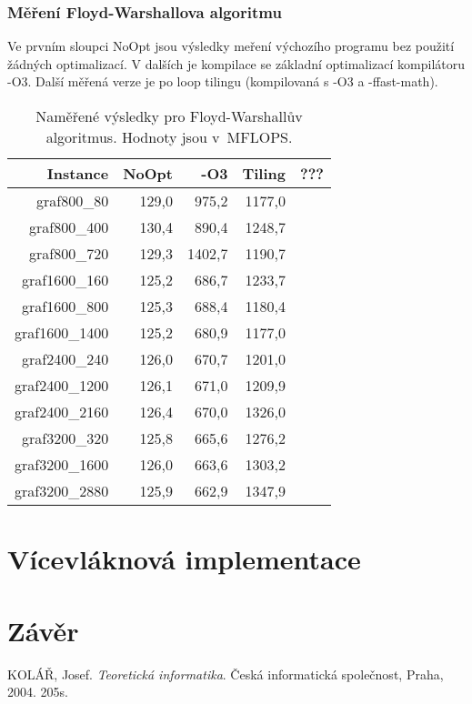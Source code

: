 \documentclass[a4paper,11pt]{article}
\begin{document}
\subsubsection{Měření Floyd-Warshallova algoritmu}
Ve prvním sloupci NoOpt jsou výsledky meření výchozího programu bez použití žádných optimalizací. V dalších je kompilace se základní optimalizací kompilátoru -O3. Další měřená verze je po loop tilingu (kompilovaná s -O3 a -ffast-math).
\begin{table}[H]
  \begin{center}
      \begin{tabular}{|r|r|r|r|r|}
      \hline
      Instance  	& NoOpt	    & -O3     & Tiling	 & ???  \\ \hline
      graf800\_80  	& 129,0     & 975,2   & 1177,0  &          \\ \hline
      graf800\_400     	& 130,4     & 890,4   & 1248,7 &	    \\ \hline
      graf800\_720  	& 129,3     & 1402,7  & 1190,7 &	    \\ \hline
      graf1600\_160    	& 125,2     & 686,7   & 1233,7 &	    \\ \hline
      graf1600\_800  	& 125,3     & 688,4   & 1180,4 &	    \\ \hline
      graf1600\_1400   	& 125,2     & 680,9   & 1177,0 &	    \\ \hline
      graf2400\_240  	& 126,0     & 670,7   & 1201,0 &          \\ \hline
      graf2400\_1200   	& 126,1     & 671,0   & 1209,9 &          \\ \hline
      graf2400\_2160  	& 126,4     & 670,0   & 1326,0 &          \\ \hline
      graf3200\_320    	& 125,8     & 665,6   & 1276,2 &          \\ \hline
      graf3200\_1600  	& 126,0     & 663,6   & 1303,2 &          \\ \hline
      graf3200\_2880   	& 125,9     & 662,9   & 1347,9 &          \\ \hline
      \end{tabular}
  \caption{Naměřené výsledky pro Floyd-Warshallův algoritmus. Hodnoty jsou v~MFLOPS.}
  \label{tab:fw1}
  \end{center}
\end{table}



\section{Vícevláknová implementace}

\section{Závěr}


\newpage
\begin{thebibliography}{1}
   KOLÁŘ, Josef.
    \emph{Teoretická informatika}.
    Česká informatická společnost, Praha, 2004. 205s.
\end{thebibliography}
\end{document}
